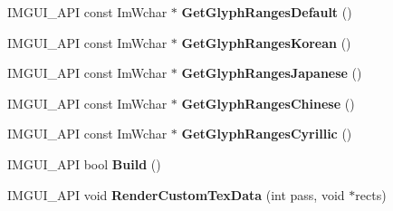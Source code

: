 \begin{DoxyCompactItemize}
\item 
\mbox{\label{struct_im_font_atlas_afd5469eb136efb2bdd4829d67fba6d7d}} 
I\+M\+G\+U\+I\+\_\+\+A\+PI const Im\+Wchar $\ast$ {\bfseries Get\+Glyph\+Ranges\+Default} ()
\item 
\mbox{\label{struct_im_font_atlas_ae40fdf868328e1cc2322ce2e5657b3c4}} 
I\+M\+G\+U\+I\+\_\+\+A\+PI const Im\+Wchar $\ast$ {\bfseries Get\+Glyph\+Ranges\+Korean} ()
\item 
\mbox{\label{struct_im_font_atlas_a1c299dc2f754183d6439ec452077b957}} 
I\+M\+G\+U\+I\+\_\+\+A\+PI const Im\+Wchar $\ast$ {\bfseries Get\+Glyph\+Ranges\+Japanese} ()
\item 
\mbox{\label{struct_im_font_atlas_a1a0d04c5b5e57e2d41d20b735b32fbfd}} 
I\+M\+G\+U\+I\+\_\+\+A\+PI const Im\+Wchar $\ast$ {\bfseries Get\+Glyph\+Ranges\+Chinese} ()
\item 
\mbox{\label{struct_im_font_atlas_a8efe35ba2b9fbefb2519e61f23c44cb8}} 
I\+M\+G\+U\+I\+\_\+\+A\+PI const Im\+Wchar $\ast$ {\bfseries Get\+Glyph\+Ranges\+Cyrillic} ()
\item 
\mbox{\label{struct_im_font_atlas_a2f77a1cae363c27e2903f1bfc29c87e5}} 
I\+M\+G\+U\+I\+\_\+\+A\+PI bool {\bfseries Build} ()
\item 
\mbox{\label{struct_im_font_atlas_a98ee9a7fa55b3c190b3fa994b2444489}} 
I\+M\+G\+U\+I\+\_\+\+A\+PI void {\bfseries Render\+Custom\+Tex\+Data} (int pass, void $\ast$rects)
\end{DoxyCompactItemize}
